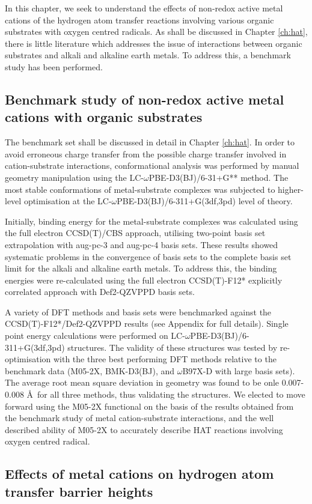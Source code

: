 In this chapter, we seek to understand the effects of non-redox active metal
cations of the hydrogen atom transfer reactions involving various organic
substrates with oxygen centred radicals. As shall be discussed in Chapter
\ref{ch:hat}, there is little literature which addresses the issue of
interactions between organic substrates and alkali and alkaline earth metals. To
address this, a benchmark study has been performed.

\subsection{Benchmark study of non-redox active metal cations with organic
  substrates}

The benchmark set shall be discussed in detail in Chapter \ref{ch:hat}. In order
to avoid erroneous charge transfer from the possible charge transfer involved in
cation-substrate interactions, conformational analysis was performed by manual
geometry manipulation using the LC-$\omega$PBE-D3(BJ)/6-31+G**
method.\cite{Johnson2013a} The most stable conformations of metal-substrate
complexes was subjected to higher-level optimisation at the
LC-$\omega$PBE-D3(BJ)/6-311+G(3df,3pd) level of theory.

Initially, binding energy for the metal-substrate complexes was calculated using
the full electron CCSD(T)/CBS approach, utilising two-point basis set
extrapolation with aug-pc-3 and aug-pc-4 basis sets. These results showed
systematic problems in the convergence of basis sets to the complete basis set
limit for the alkali and alkaline earth metals. To address this, the binding
energies were re-calculated using the full electron CCSD(T)-F12* explicitly
correlated approach\cite{Hattig2010} with Def2-QZVPPD basis sets.

A variety of DFT methods and basis sets were benchmarked against the
CCSD(T)-F12*/Def2-QZVPPD results (see Appendix  for full
details). Single point energy calculations were performed on
LC-$\omega$PBE-D3(BJ)/6-311+G(3df,3pd) structures. The validity of these
structures was tested by re-optimisation with the three best performing DFT
methods relative to the benchmark data (M05-2X, BMK-D3(BJ), and $\omega$B97X-D
with large basis sets). The average root mean square deviation in geometry was
found to be onle 0.007-0.008 \AA ~for all three methods, thus validating the
structures. We elected to move forward using the M05-2X functional on the basis
of the results obtained from the benchmark study of metal cation-substrate
interactions, and the well described ability of M05-2X to accurately describe
HAT reactions involving oxygen centred radical.\cite{Galano2013}


\subsection{Effects of metal cations on hydrogen atom transfer barrier heights}



